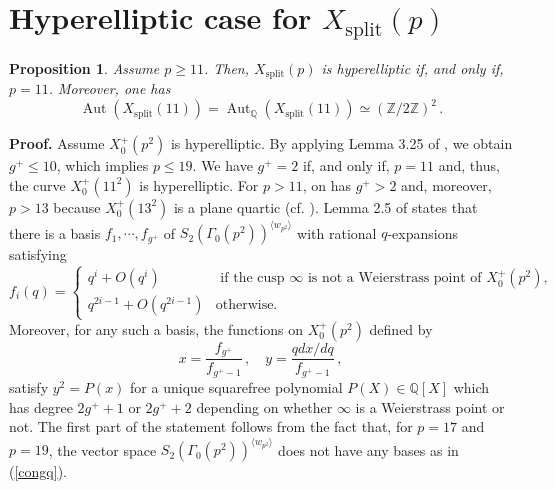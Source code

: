 \documentclass[a4paper,12pt]{article}
\newtheorem{prop}{Proposition}%
\theoremstyle{definition}
\theoremstyle{remark}
\numberwithin{equation}{section}
\newcommand{\Q}{\mathbb{Q}}
\newcommand{\Z}{\mathbb{Z}}
\newcommand{\Aut}{\operatorname{Aut}}
\begin{document}
\section{Hyperelliptic case for $X_{\text{split}}(p)$}




\begin{prop}\label{11} Assume $p\geq 11 $. Then,
$X_{\operatorname{split}}(p)$ is hyperelliptic if, and only if,  $p=11$. Moreover, one has $$\Aut (X_{\operatorname{split}}(11))=\Aut_{\Q}(X_{\operatorname{split}}(11))\simeq
(\Z/2\Z)^2\,.
$$
\end{prop}
\noindent
{\bf Proof.} Assume  $X_0^+(p^2)$ is hyperelliptic. By  applying Lemma 3.25 of \cite{BGGP}, we obtain  $g^+\leq 10$, which implies  $p\leq 19$. We have $g^+=2$ if, and only if,   $p=11$ and, thus, the curve $X_0^+(11^2)$ is hyperelliptic. For $p>11$,  on has $g^+>2$   and, moreover, $p>13$ because  $X_0^+(13^2)$ is a plane quartic (cf. \cite{Baran}).  Lemma 2.5 of \cite{BGGP} states that there is a basis $f_1,\cdots, f_{g^+}$ of $S_2(\Gamma_0(p^2))^{\langle w_{p^2}\rangle}$ with rational $q$-expansions satisfying
\begin{equation}\label{congq}
f_i(q)=\left\{\begin{array}{cr} q^i+ O(q^i)&\text{ if the cusp $\infty$ is not a Weierstrass point of $X_0^+ (p^2)$,}\\q^{2 i-1}+ O(q^{2i-1})& \text{otherwise.}\end{array} \right.
\end{equation}
Moreover,  for any  such a basis,  the functions on $X_0 ^+(p^2)$ defined by
$$
x=\frac{f_{g^+}}{f_{g^+-1}}\,,\quad  y=\frac{ q dx/dq}{f_{g^+-1}}\,,
$$
satisfy $y^2=P(x)$ for  a unique squarefree polynomial $P(X)\in\Q[X]$ which has  degree $2g^++1$ or $2g^++2$ depending on whether $\infty$ is a Weierstrass point or not. The first part of the statement follows from the fact that,  for $p=17$ and $p=19$,  the vector space $S_2(\Gamma_0(p^2))^{\langle w_{p^2}\rangle}$ does not have any bases as in (\ref{congq}).
\end{document}
